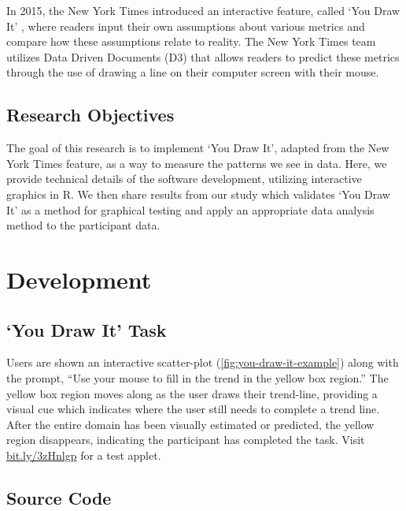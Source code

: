 \documentclass[12pt]{article}
\begin{document}
In 2015, the New York Times introduced an interactive feature, called
`You Draw It' \citep{aisch2015you}, where readers input their own
assumptions about various metrics and compare how these assumptions
relate to reality. The New York Times team utilizes Data Driven
Documents (D3) that allows readers to predict these metrics through the
use of drawing a line on their computer screen with their mouse.

\hypertarget{research-objectives}{%
\subsection{Research Objectives}\label{research-objectives}}

The goal of this research is to implement `You Draw It', adapted from
the New York Times feature, as a way to measure the patterns we see in
data. Here, we provide technical details of the software development,
utilizing interactive graphics in R. We then share results from our
study which validates `You Draw It' as a method for graphical testing
and apply an appropriate data analysis method to the participant data.

\hypertarget{development}{%
\section{Development}\label{development}}

\hypertarget{you-draw-it-task}{%
\subsection{`You Draw It' Task}\label{you-draw-it-task}}

Users are shown an interactive scatter-plot
(\cref{fig:you-draw-it-example}) along with the prompt, ``Use your mouse
to fill in the trend in the yellow box region.'' The yellow box region
moves along as the user draws their trend-line, providing a visual cue
which indicates where the user still needs to complete a trend line.
After the entire domain has been visually estimated or predicted, the
yellow region disappears, indicating the participant has completed the
task. Visit \href{https://bit.ly/3zHnlgp\%7D}{bit.ly/3zHnlgp} for a test
applet.

\hypertarget{source-code}{%
\subsection{Source Code}\label{source-code}}
\end{document}

